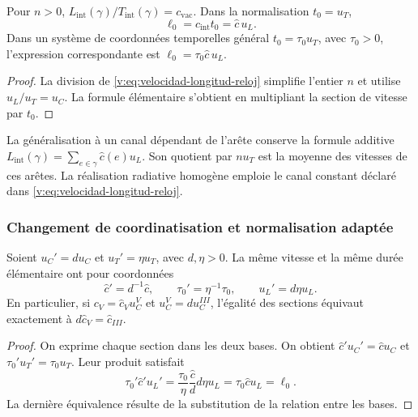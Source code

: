 \begin{corollary}
\label{v:cor:longitud-elemental-constitutiva}
Pour $n>0$, $L_{\mathrm{int}}(\gamma)/T_{\mathrm{int}}(\gamma)
=c_{\mathrm{vac}}$. Dans la normalisation $t_0=u_T$,
\begin{equation}
 \ell_0=c_{\mathrm{int}}t_0=\widehat c\,u_L.
 \label{v:eq:longitud-elemental-constitutiva}
\end{equation}
Dans un système de coordonnées temporelles général $t_0=\tau_0u_T$, avec $\tau_0>0$,
l’expression correspondante est $\ell_0=\tau_0\widehat c\,u_L$.
\end{corollary}
\begin{proof}
La division de \eqref{v:eq:velocidad-longitud-reloj} simplifie l’entier
$n$ et utilise $u_L/u_T=u_C$. La formule élémentaire s’obtient
en multipliant la section de vitesse par $t_0$.
\end{proof}

La généralisation à un canal dépendant de l’arête conserve la formule
additive $L_{\mathrm{int}}(\gamma)=\sum_{e\in\gamma}\widehat c(e)u_L$.
Son quotient par $nu_T$ est la moyenne des vitesses de ces arêtes.
La réalisation radiative homogène emploie le canal constant déclaré
dans \eqref{v:eq:velocidad-longitud-reloj}.

\subsubsection{Changement de coordinatisation et normalisation adaptée}

\begin{proposition}
\label{v:prop:covariancia-identidad-velocidad}
Soient $u_C'=d u_C$ et $u_T'=\eta u_T$, avec $d,\eta>0$.
La même vitesse et la même durée élémentaire ont pour coordonnées
\begin{equation}
 \widehat c'=d^{-1}\widehat c,
 \qquad \tau_0'=\eta^{-1}\tau_0,
 \qquad u_L'=d\eta u_L.
 \label{v:eq:velocidad-cambio-carta}
\end{equation}
En particulier, si $c_V=\widehat c_Vu_C^V$ et
$u_C^V=d u_C^{III}$, l’égalité des sections équivaut exactement à
$d\widehat c_V=\widehat c_{III}$.
\end{proposition}
\begin{proof}
On exprime chaque section dans les deux bases. On obtient
$\widehat c'u_C'=\widehat c u_C$ et
$\tau_0'u_T'=\tau_0u_T$. Leur produit satisfait
\[
 \tau_0'\widehat c' u_L'
 =\frac{\tau_0}{\eta}\frac{\widehat c}{d}
       d\eta u_L
 =\tau_0\widehat c u_L=\ell_0.
\]
La dernière équivalence résulte de la substitution de la relation entre les bases.
\end{proof}

